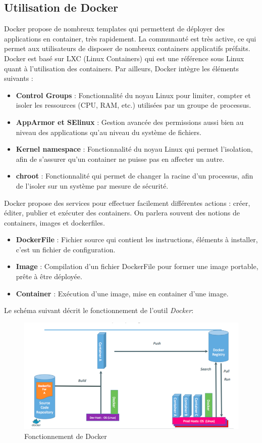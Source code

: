 \begin{onehalfspace}
\subsection{Utilisation de Docker}
Docker propose de nombreux templates qui permettent de déployer des applications en container, très rapidement. La communauté est très active, ce qui permet aux utilisateurs de disposer de nombreux containers applicatifs préfaits.
Docker est basé sur LXC (Linux Containers) qui est une référence sous Linux quant à l’utilisation des containers. Par ailleurs, Docker intègre les éléments suivants :
\begin{itemize}
\item \textbf{Control Groups} : Fonctionnalité du noyau Linux pour limiter, compter et isoler les ressources (CPU, RAM, etc.) utilisées par un groupe de processus.
\item \textbf{AppArmor et SElinux} : Gestion avancée des permissions aussi bien au niveau des applications qu’au niveau du système de fichiers.
\item \textbf{Kernel namespace} : Fonctionnalité du noyau Linux qui permet l’isolation, afin de s’assurer qu’un container ne puisse pas en affecter un autre.
\item \textbf{chroot} : Fonctionnalité qui permet de changer la racine d’un processus, afin de l’isoler sur un système par mesure de sécurité.
\end{itemize}

Docker propose des services pour effectuer facilement différentes actions : créer, éditer, publier et exécuter des containers. On parlera souvent des notions de containers, images et dockerfiles.

\begin{itemize}
\item \textbf{DockerFile} : Fichier source qui contient les instructions, éléments à installer, c’est un fichier de configuration.
\item \textbf{Image} : Compilation d’un fichier DockerFile pour former une image portable, prête à être déployée.
\item \textbf{Container} : Exécution d’une image, mise en container d’une image.
\end{itemize}


Le schéma suivant décrit le fonctionnement de l'outil \emph{Docker}: 
\begin{figure}[H]
\centering
\includegraphics [scale=0.6]{chapitre2/assets/utilisation.png}
\caption{Fonctionnement de Docker}
\end{figure}

\end{onehalfspace}